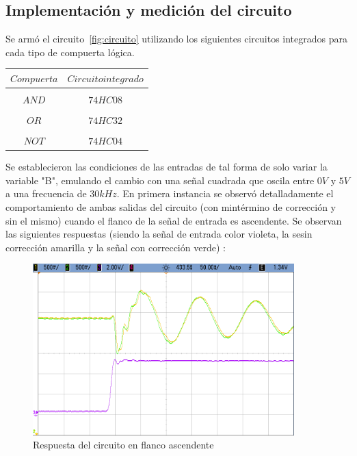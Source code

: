\subsection{Implementaci\'on y medici\'on del circuito}

Se arm\'o el circuito~\ref{fig:circuito} utilizando los siguientes circuitos integrados para cada tipo de compuerta l\'ogica.

\begin{table}[H]
    \centering
    \begin{tabular}{c c}
        $Compuerta$ & $Circuito integrado$\\
        \hline \\
        $AND$ & $74HC08$\\
        \hline \\
        $OR$ & $74HC32$\\
        \hline \\
        $NOT$ & $74HC04$\\
        \hline
    \end{tabular}
\end{table}

Se establecieron las condiciones de las entradas de tal forma de solo variar la variable \textsc{"B"}, emulando el cambio con una se\~nal cuadrada que oscila entre $0V$ y $5V$ a una frecuencia de $30kHz$. En primera instancia se observ\'o detalladamente el comportamiento de ambas salidas del circuito (con mint\'ermino de correcci\'on y sin el mismo) cuando el flanco de la se\~nal de entrada es ascendente. Se observan las siguientes respuestas (siendo la se\~nal de entrada color violeta, la se\nal sin correcci\'on amarilla y la se\~nal con correcci\'on verde) :

\begin{figure}[H]
    \centering
    \includegraphics[width=0.9\textwidth]{../EJ3/Recursos/cropped_EJ3_positive_slope_response.png}
	\caption{Respuesta del circuito en flanco ascendente}
   	\label{fig:EJ3_positive_slope_response}
\end{figure}

